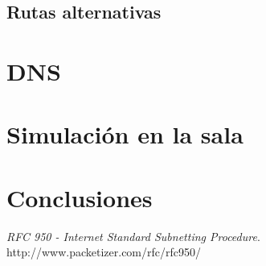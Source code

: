 \documentclass[12pt,titlepage]{article}
\begin{document}
\subsection{Rutas alternativas}




\section{DNS}


\section{Simulación en la sala}

\section{Conclusiones}



\newpage

\begin{thebibliography}{9}

  \emph{RFC 950 - Internet Standard Subnetting Procedure}. \\
  http://www.packetizer.com/rfc/rfc950/

\end{thebibliography}


\end{document}
